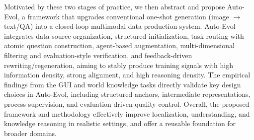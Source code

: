 \documentclass[type=master, twoside]{fduthesis}
\begin{document}
\begin{abstract*}
Motivated by these two stages of practice, we then abstract and propose Auto-Evol, a framework that upgrades conventional one-shot generation (image $\rightarrow$ text/QA) into a closed-loop multimodal data production system. Auto-Evol integrates data source organization, structured initialization, task routing with atomic question construction, agent-based augmentation, multi-dimensional filtering and evaluation-style verification, and feedback-driven rewriting/regeneration, aiming to stably produce training signals with high information density, strong alignment, and high reasoning density. The empirical findings from the GUI and world knowledge tasks directly validate key design choices in Auto-Evol, including structured anchors, intermediate representations, process supervision, and evaluation-driven quality control. Overall, the proposed framework and methodology effectively improve localization, understanding, and knowledge reasoning in realistic settings, and offer a reusable foundation for broader domains.

\end{abstract*}
\end{document}
